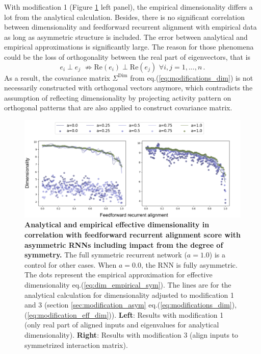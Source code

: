 \documentclass[11pt]{article}
\begin{document}
	With modification 1 (Figure \ref{fig:dim_asym} left panel), the empirical dimensionality differs a lot from the analytical calculation. Besides, there is no significant correlation between dimensionality and feedforward recurrent alignment with empirical data as long as asymmetric structure is included. The error between analytical and empirical approximations is significantly large. The reason for those phenomena could be the loss of orthogonality between the real part of eigenvectors, that is 
	\begin{equation}
		e_i \perp e_j  \, \, \nRightarrow \text{Re}(e_i) \perp \text{Re}(e_j) \, \, \forall i, j = 1, ..., n \, .
	\end{equation}
	As a result, the covariance matrix $\Sigma^{\text{Dim}}$ from eq.(\ref{eq:modifications_dim}) is not necessarily constructed with orthogonal vectors anymore, which contradicts the assumption of reflecting dimensionality by projecting activity pattern on orthogonal patterns that are also applied to construct covariance matrix. 
	
		\begin{figure}[H]
			\centering
			\includegraphics[width=\textwidth]{../figures/dim_asym.pdf}
			\caption{\textbf{Analytical and empirical effective dimensionality in correlation with feedforward recurrent alignment score with asymmetric RNNs including impact from the degree of symmetry.} The full symmetric recurrent network ($a = 1.0$) is a control for other cases. When $a = 0.0$, the RNN is fully asymmetric. The dots represent the empirical approximation for effective dimensionality eq.(\ref{eq:dim_empirical_sym}). The lines are for the analytical calculation for dimensionality adjusted to modification 1 and 3 (section \ref{sec:modification_asym} eq.(\ref{eq:modifications_dim}), (\ref{eq:modification_eff_dim})). \textbf{Left}: Results with modification 1 (only real part of aligned inputs and eigenvalues for analytical dimensionality). \textbf{Right}: Results with modification 3 (align inputs to symmetrized interaction matrix).}
			\label{fig:dim_asym}
		\end{figure}
	
\end{document}
